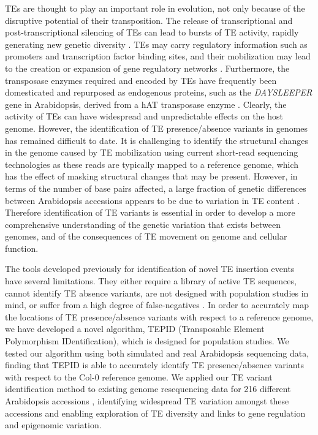 \documentclass[12pt]{article}
\begin{document}
TEs are thought to play an important role in evolution, not only because
of the disruptive potential of their transposition. The release of
transcriptional and post-transcriptional silencing of TEs can lead to
bursts of TE activity, rapidly generating new genetic diversity
\cite{Vitte:2014he}. TEs may carry regulatory information such as
promoters and transcription factor binding sites, and their mobilization
may lead to the creation or expansion of gene regulatory networks
\cite{Henaff:2014hg, Bolger:2014bn, Ito:2011dga, Makarevitch:2015ho}.
Furthermore, the transposase enzymes required and encoded by TEs have
frequently been domesticated and repurposed as endogenous proteins, such
as the \emph{DAYSLEEPER} gene in Arabidopsis, derived from a hAT
transposase enzyme \cite{Bundock:2005gp}. Clearly, the activity of TEs
can have widespread and unpredictable effects on the host genome.
However, the identification of TE presence/absence variants in genomes
has remained difficult to date. It is challenging to identify the
structural changes in the genome caused by TE mobilization using current
short-read sequencing technologies as these reads are typically mapped
to a reference genome, which has the effect of masking structural
changes that may be present. However, in terms of the number of base
pairs affected, a large fraction of genetic differences between
Arabidopsis accessions appears to be due to variation in TE content
\cite{Cao:2011cf, Quadrana:2016bi}. Therefore identification of TE
variants is essential in order to develop a more comprehensive
understanding of the genetic variation that exists between genomes, and
of the consequences of TE movement on genome and cellular function.

The tools developed previously for identification of novel TE insertion
events have several limitations. They either require a library of active
TE sequences, cannot identify TE absence variants, are not designed with
population studies in mind, or suffer from a high degree of
false-negatives
\cite{Thung:2014ir, Robb:2013gw, Henaff:2015dl, Quadrana:2016bi}. In
order to accurately map the locations of TE presence/absence variants
with respect to a reference genome, we have developed a novel algorithm,
TEPID (Transposable Element Polymorphism IDentification), which is
designed for population studies. We tested our algorithm using both
simulated and real Arabidopsis sequencing data, finding that TEPID is
able to accurately identify TE presence/absence variants with respect to
the Col-0 reference genome. We applied our TE variant identification
method to existing genome resequencing data for 216 different
Arabidopsis accessions \cite{Schmitz:2013iu}, identifying widespread TE
variation amongst these accessions and enabling exploration of TE
diversity and links to gene regulation and epigenomic variation.
\end{document}
